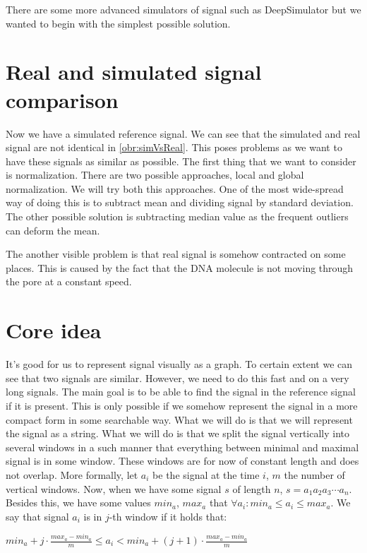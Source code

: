 There are some more advanced simulators of signal such as DeepSimulator but we
wanted to begin with the simplest possible solution.

\section{Real and simulated signal comparison}

Now we have a simulated reference signal. We can see that the simulated and real
signal are not identical in \ref{obr:simVsReal}. This poses problems as we want to have these signals as
similar as possible. The first thing that we want to consider is normalization. There
are two possible approaches, local and global normalization. We will try both this
approaches. One of the most wide-spread way of doing this is to subtract mean and dividing
signal by standard deviation. The other possible solution is subtracting median value
as the frequent outliers can deform the mean. 

The another visible problem is that real signal is somehow contracted
on some places. This is caused by the fact that the DNA molecule is not moving
through the pore at a constant speed. 

\section{Core idea}

It's good for us to represent signal visually as a graph. To certain extent we
can see that two signals are similar. However, we need to do this fast and on a very
long signals. The main goal is to be able to find the signal in the reference
signal if it is present. This is only possible if we somehow represent the signal
in a more compact form in some searchable way. What we will do is that we will
represent the signal as a string. What we will do is that we split the signal vertically
into several windows in a such manner that everything between minimal and maximal
signal is in some window. These windows are for now of constant length and does not
overlap. More formally, let $a_i$ be the signal at the time $i$, $m$ the number of
vertical windows. Now, when we have some signal $s$ of length $n$, $s=a_1a_2a_3\cdots a_n$. Besides this, we have some
values $min_a$, $max_a$ that $\forall a_i: min_a \leq a_i \leq max_a$. We say that signal $a_i$ is in $j$-th
window if it holds that:

\begin{center}
$min_a + j\cdot \frac{max_a-min_a}{m} \leq a_i < min_a + (j+1)\cdot \frac{max_a-min_a}{m}$
\end{center}
